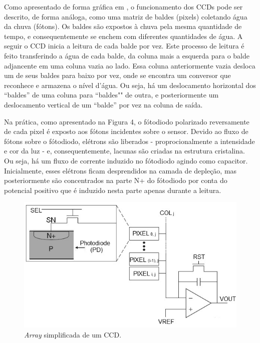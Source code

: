 \documentclass[10pt,a4paper,twocolumn]{article}
\begin{document}
	Como apresentado de forma gráfica em \cite{Spectral}, o funcionamento dos CCDs pode ser descrito, de forma análoga, como uma matriz de baldes (pixels) coletando água da chuva (fótons). Os baldes são expostos à chuva pela mesma quantidade de tempo, e consequentemente se enchem com diferentes quantidades de água. A seguir o CCD inicia a leitura de cada balde por vez. Este processo de leitura é feito transferindo a água de cada balde, da coluna mais a esquerda para o balde adjancente em uma coluna vazia ao lado. Essa coluna anteriormente vazia desloca um de seus baldes para baixo por vez, onde se encontra um conversor que reconhece e armazena o nível d'água. Ou seja, há um deslocamento horizontal dos ``baldes'' de uma coluna para ``baldes"" de outra, e posteriormente um deslocamento vertical de um ``balde'' por vez na coluna de saída.
	
	Na prática, como apresentado na Figura 4, o fótodiodo polarizado reversamente de cada pixel é exposto aos fótons incidentes sobre o sensor. Devido ao fluxo de fótons sobre o fótodiodo, elétrons são liberados - proprocionalmente a intensidade e cor da luz - e, consequentemente, lacunas são criadas na estrutura cristalina. Ou seja, há um fluxo de corrente induzido no fótodiodo agindo como capacitor. Inicialmente, esses elétrons ficam desprendidos na camada de depleção, mas posteriormente são concentrados na parte N+ do fótodiodo por conta do potencial positivo que é induzido nesta parte apenas durante a leitura.
	
	\begin{figure}[H]
	\centering
	\includegraphics[scale=0.5]{imagens/passive-pixel.jpg}
	\caption{\textit{Array} simplificada de um CCD.}
	\end{figure}
	
\end{document}
